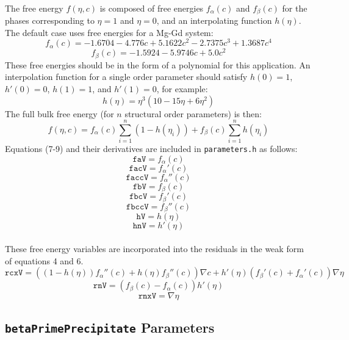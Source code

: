 \documentclass[11pt]{article} %
\begin{document}
\paragraph{}
The free energy $f(\eta,c)$ is composed of free energies $f_\alpha(c)$ and $f_\beta(c)$ for the phases corresponding to $\eta=1$ and $\eta=0$, and an interpolating function $h(\eta)$.  The default case uses free energies for a Mg-Gd system:
\begin{equation}
f_\alpha(c)=-1.6704 -4.776 c+5.1622 c^2 -2.7375 c^3 +1.3687 c^4
\end{equation}
\begin{equation}
f_\beta(c)=-1.5924 -5.9746 c+5.0 c^2
\end{equation}
These free energies should be in the form of a polynomial for this application.  An interpolation function for a single order parameter should satisfy $h(0)=1$, $h'(0)=0$, $h(1)=1$, and $h'(1)=0$, for example:
\begin{equation}
h(\eta)= \eta^3 (10 - 15 \eta + 6 \eta^2)
\end{equation}
The full bulk free energy (for $n$ structural order parameters) is then:
\begin{equation}
f(\eta, c)= f_\alpha(c) \sum_{i=1}^n (1-h(\eta_i)) + f_\beta(c) \sum_{i=1}^n h(\eta_i)
\end{equation}
Equations (7-9) and their derivatives are included in \texttt{parameters.h} as follows:
\[ \texttt{faV} = f_\alpha(c) \]
\[ \texttt{facV}  = f_\alpha'(c) \]
\[ \texttt{faccV} = f_\alpha''(c) \]
\[ \texttt{fbV} = f_\beta(c) \]
\[ \texttt{fbcV} = f_\beta'(c) \]
\[ \texttt{fbccV}  = f_\beta''(c) \]
\[ \texttt{hV} = h(\eta) \]
\[ \texttt{hnV} = h'(\eta) \]
\paragraph{}
These free energy variables are incorporated into the residuals in the weak form of equations 4 and 6.
\[ \texttt{rcxV} = \left( (1-h(\eta)) f_\alpha''(c) + h(\eta) f_\beta''(c) \right) \nabla c + h'(\eta)(f_\beta'(c)+f_\alpha'(c)) \nabla \eta \]
\[ \texttt{rnV} =( f_\beta(c)-f_\alpha(c)) h'(\eta) \]
\[ \texttt{rnxV} = \nabla \eta \]

\subsection{\texttt{betaPrimePrecipitate} Parameters}
\end{document}
